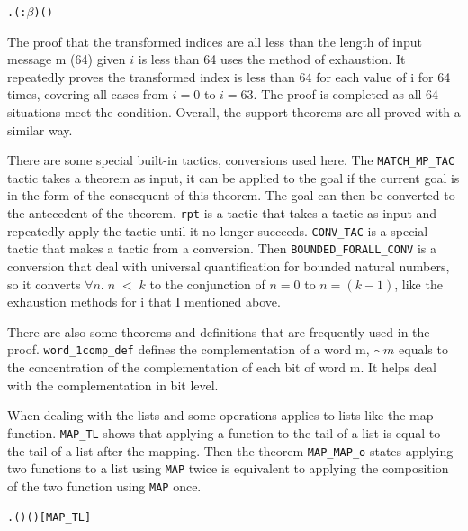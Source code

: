 \documentclass{article}
\begin{document}
\begin{alltt}
\HOLTokenTurnstile{} \HOLSymConst{\HOLTokenForall{}}.  \HOLSymConst{\HOLTokenLt{}}  (:\ensuremath{\beta}) \HOLSymConst{\HOLTokenImp{}} ()    \HOLSymConst{=}  
\end{alltt}

The proof that the transformed indices are all less than the length of input message m (64) given $i$ is less than 64 uses
the method of exhaustion. It repeatedly proves the transformed index is less than 64 for each value of i for 64 times, covering
all cases from $i=0$ to $i=63$. The proof is completed as all 64 situations meet the condition. Overall, the support theorems are
all proved with a similar way.

There are some special built-in tactics, conversions used here. The \verb|MATCH_MP_TAC| tactic takes a theorem as input,
it can be applied to the goal if the current goal is in the form of the consequent of this theorem. The goal can then be
converted to the antecedent of the theorem. \verb|rpt| is a tactic that takes a tactic as input and repeatedly apply the tactic until
it no longer succeeds. \verb|CONV_TAC| is a special tactic that makes a tactic from a conversion. Then \verb|BOUNDED_FORALL_CONV| is a
conversion that deal with universal quantification for bounded natural numbers, so it converts $\forall n. \;n \; < \; k$ to
the conjunction of $n=0$ to $n=(k-1)$, like the exhaustion methods for i that I mentioned above.

There are also some theorems and definitions that are frequently used in the proof. \verb|word_1comp_def| defines the complementation of a word m,
$\sim m$ equals to the concentration of the complementation of each bit of word m. It helps deal with the complementation in
bit level.

When dealing with the lists and some operations applies to lists like the map function. \verb|MAP_TL| shows that applying a function
to the tail of a list is equal to the tail of a list after the mapping. Then the theorem \verb|MAP_MAP_o| states applying two functions
to a list using \verb|MAP| twice is equivalent to applying the composition of the two function using \verb|MAP| once.

\begin{alltt}
\HOLTokenTurnstile{} \HOLSymConst{\HOLTokenForall{}} .   ( ) \HOLSymConst{=}  (  )\hfill{[MAP_TL]}
\end{alltt}
\end{document}
